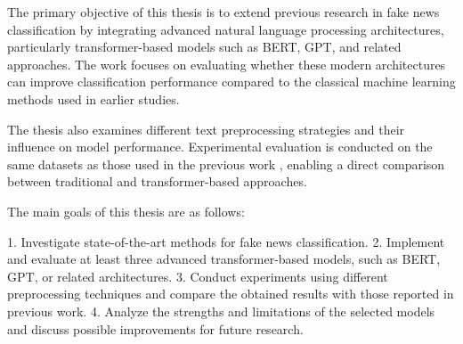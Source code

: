 \begin{markdown}

The primary objective of this thesis is to extend previous research in fake news classification by integrating advanced natural language processing architectures, particularly transformer-based models such as BERT, GPT, and related approaches. The work focuses on evaluating whether these modern architectures can improve classification performance compared to the classical machine learning methods used in earlier studies.

The thesis also examines different text preprocessing strategies and their influence on model performance. Experimental evaluation is conducted on the same datasets as those used in the previous work \cite{flajzik_classification_2024}, enabling a direct comparison between traditional and transformer-based approaches.
    
The main goals of this thesis are as follows:

1. Investigate state-of-the-art methods for fake news classification.
2. Implement and evaluate at least three advanced transformer-based models, such as BERT, GPT, or related architectures.
3. Conduct experiments using different preprocessing techniques and compare the obtained results with those reported in previous work.
4. Analyze the strengths and limitations of the selected models and discuss possible improvements for future research.

\end{markdown}